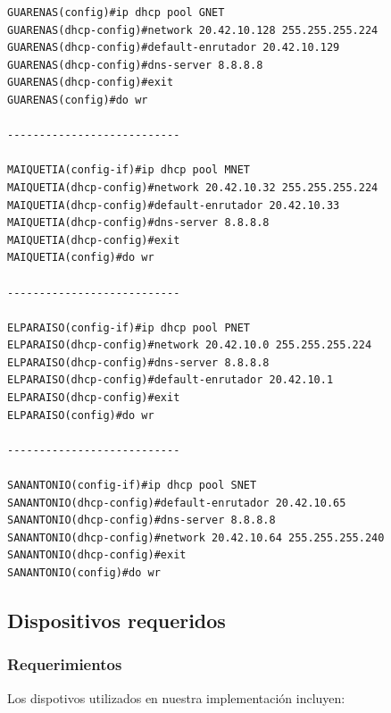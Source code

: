 \documentclass[]{article}
\begin{document}
\begin{verbatim}
GUARENAS(config)#ip dhcp pool GNET
GUARENAS(dhcp-config)#network 20.42.10.128 255.255.255.224
GUARENAS(dhcp-config)#default-enrutador 20.42.10.129
GUARENAS(dhcp-config)#dns-server 8.8.8.8
GUARENAS(dhcp-config)#exit
GUARENAS(config)#do wr

---------------------------

MAIQUETIA(config-if)#ip dhcp pool MNET
MAIQUETIA(dhcp-config)#network 20.42.10.32 255.255.255.224
MAIQUETIA(dhcp-config)#default-enrutador 20.42.10.33
MAIQUETIA(dhcp-config)#dns-server 8.8.8.8
MAIQUETIA(dhcp-config)#exit
MAIQUETIA(config)#do wr

---------------------------

ELPARAISO(config-if)#ip dhcp pool PNET
ELPARAISO(dhcp-config)#network 20.42.10.0 255.255.255.224
ELPARAISO(dhcp-config)#dns-server 8.8.8.8
ELPARAISO(dhcp-config)#default-enrutador 20.42.10.1
ELPARAISO(dhcp-config)#exit
ELPARAISO(config)#do wr

---------------------------

SANANTONIO(config-if)#ip dhcp pool SNET
SANANTONIO(dhcp-config)#default-enrutador 20.42.10.65
SANANTONIO(dhcp-config)#dns-server 8.8.8.8
SANANTONIO(dhcp-config)#network 20.42.10.64 255.255.255.240
SANANTONIO(dhcp-config)#exit
SANANTONIO(config)#do wr
\end{verbatim}

\subsection{Dispositivos requeridos}\label{dispositivos-requeridos}

\subsubsection{Requerimientos}\label{requerimientos}

Los dispotivos utilizados en nuestra implementación incluyen:
\end{document}
